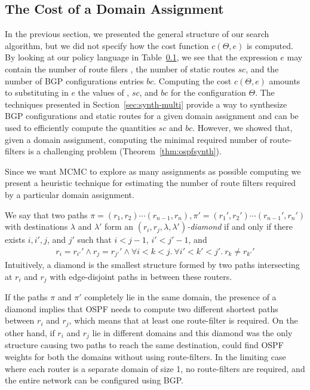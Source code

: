 \subsection{The Cost of a Domain Assignment}
In the previous section, we presented the general structure of our search algorithm,
but we did not specify how the cost function $c(\Theta,e)$
is computed. 
By looking at our policy language in Table~\ref{},
we see that the expression $e$ may contain
the number of route filers ,
the number of static routes $sc$,
and the number of BGP configurations entries $bc$.
Computing the cost $c(\Theta,e)$ amounts to substituting in $e$ the values of ,
$sc$, and $bc$ for the configuration $\Theta$.
The techniques presented in Section~\ref{sec:synth-multi} provide a way to 
synthesize BGP configurations and static routes for a given domain assignment
and can be used to 
efficiently compute the quantities $sc$ and $bc$.
However, we showed that, given a domain assignment, computing the  minimal required number of route-filters 
is a challenging problem (Theorem~\ref{thm:ospfsynth}).


Since we want MCMC to explore as many assignments as possible
computing 
we present a heuristic technique for estimating the number of route 
filters required by a particular domain assignment. 

We say that two paths $\pi=(r_1,r_2)\cdots (r_{n-1},r_n), \pi'=(r_1',r_2')\cdots (r_{n-1}',r_n')$ with destinations $\lambda$ and $\lambda'$
form an $(r_i, r_j, \lambda, \lambda')$\emph{-diamond} if and only if
there exists $i,i',j$, and $j'$ such that $i<j-1$, $i'<j'-1$, and
\begin{multline}
r_i{=}r_{i'}' \wedge  r_j{=}r_{j'}' \wedge  \forall i{<}k{<}j.~\forall i'{<}k'{<}j'.~r_{k}{\neq} r_{k'}'  
\end{multline}
Intuitively, a diamond is the smallest structure formed by two
paths intersecting at $r_i$ and $r_j$ with edge-disjoint paths in 
between these routers. 

If the paths $\pi$ and $\pi'$ completely lie in the same domain,
the presence of a diamond 
implies that OSPF needs to compute two different shortest paths between $r_i$ and $r_j$, 
which means that
at least one route-filter is required.
On the other hand, if $r_i$ and $r_j$ lie in
different domains and this diamond
was the only structure causing two paths to reach the same destination, \name could find OSPF weights for
both the domains without using route-filters. 
In the limiting
case where each router is a separate domain of size 1,
no route-filters are required, and the entire 
network can be configured using BGP. 

